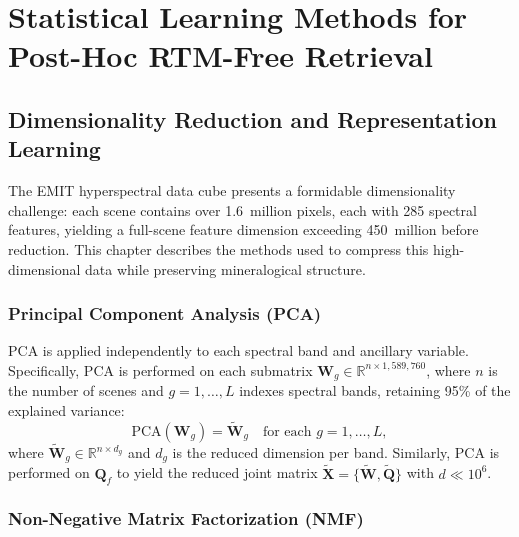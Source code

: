 \documentclass[11pt]{report}
\newcommand{\R}{\mathbb{R}}
\begin{document}
\part{Statistical Learning Methods for Post-Hoc RTM-Free Retrieval}
\label{part:statistical}


\chapter{Dimensionality Reduction and Representation Learning}
\label{chap:dimred}

The EMIT hyperspectral data cube presents a formidable dimensionality challenge: each scene contains over 1.6~million pixels, each with 285 spectral features, yielding a full-scene feature dimension exceeding 450~million before reduction. This chapter describes the methods used to compress this high-dimensional data while preserving mineralogical structure.

\section{Principal Component Analysis (PCA)}

PCA is applied independently to each spectral band and ancillary variable. Specifically, PCA is performed on each submatrix $\mathbf{W}_g \in \R^{n \times 1{,}589{,}760}$, where $n$ is the number of scenes and $g = 1, \ldots, L$ indexes spectral bands, retaining 95\% of the explained variance:
\[
\text{PCA}(\mathbf{W}_g) = \tilde{\mathbf{W}}_g \quad \text{for each } g = 1, \ldots, L,
\]
where $\tilde{\mathbf{W}}_g \in \R^{n \times d_g}$ and $d_g$ is the reduced dimension per band. Similarly, PCA is performed on $\mathbf{Q}_f$ to yield the reduced joint matrix $\tilde{\mathbf{X}} = \{\tilde{\mathbf{W}}, \tilde{\mathbf{Q}}\}$ with $d \ll 10^6$.

\section{Non-Negative Matrix Factorization (NMF)}

\end{document}

